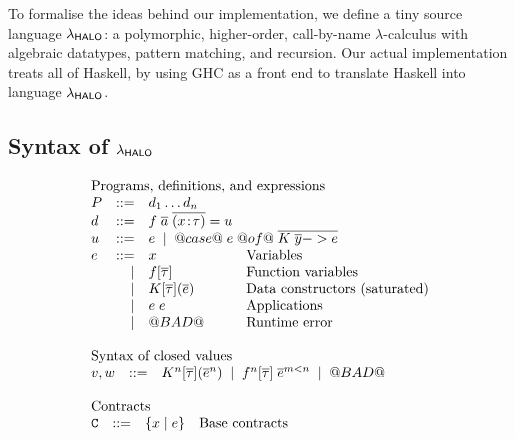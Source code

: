 To formalise the ideas behind our implementation, we define a
tiny source language $\lambda_{\sf HALO}$:
a polymorphic, higher-order, call-by-name $\lambda$-calculus with
algebraic datatypes, pattern matching, and recursion.
Our actual implementation treats all of Haskell, by using GHC as a front
end to translate Haskell into language $\lambda_{\sf HALO}$.


\subsection{Syntax of $\lambda_{\sf HALO}$} \label{s:syntax}

\begin{figure}
\[\begin{array}{l}
\begin{array}{lrll}
\multicolumn{4}{l}{\text{Programs, definitions, and expressions}} \\
P   & ::= & d_1 \ldots d_n \\
d   & ::= & f\; \ol{a} \; \ol{(x\!:\!\tau)} = u \\
u   & ::= & \multicolumn{2}{l}{e \; \mid \; @case@\;e\;@of@\;\ol{K\;\ol{y} -> e}} \\
e  & ::=  & x            & \text{Variables} \\
   & \mid & f[\ol{\tau}] & \text{Function variables} \\
   & \mid & K[\ol{\tau}](\ol{e}) & \text{Data constructors (saturated)} \\
   & \mid & e\;e         & \text{Applications} \\
   & \mid & @BAD@        & \text{Runtime error} \\
\end{array}\\ \\
\begin{array}{lrll}
\multicolumn{3}{l}{\text{Syntax of closed values}} \\
 v,w & ::= & K^\ar[\ol{\tau}](\oln{e}{\ar}) \;\mid\; f^\ar[\ol{\tau}]\;\oln{e}{m < \ar} \;\mid\; @BAD@ \\ \\
\end{array}
\\
\begin{array}{lrll}
\multicolumn{3}{l}{\text{Contracts}} \\
 \Ct & ::=  & \{ x \mid e \}        & \text{Base contracts}  \\

\end{array}
\end{array}\]
\end{figure}
